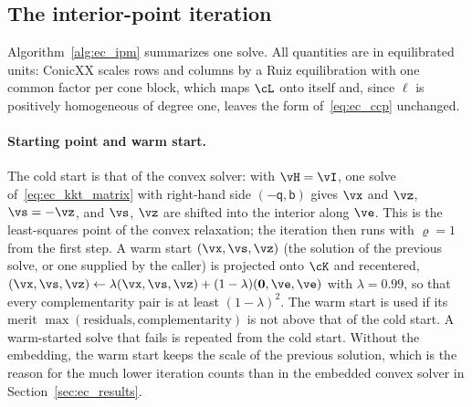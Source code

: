 \subsection{The interior-point iteration}\label{sec:ec_loop}
%
Algorithm~\ref{alg:ec_ipm} summarizes one solve. All quantities are in equilibrated units: ConicXX scales rows and columns by a Ruiz equilibration with one common factor per cone block, which maps $\cL$ onto itself and, since $\ell$ is positively homogeneous of degree one, leaves the form of~\eqref{eq:ec_ccp} unchanged.
%
\begin{algorithm}[t]
	\caption{Coulomb interior-point method ().}\label{alg:ec_ipm}
\end{algorithm}
%
\paragraph{Starting point and warm start.} The cold start is that of the convex solver: with $\vH = \vI$, one solve of~\eqref{eq:ec_kkt_matrix} with right-hand side $(-\mathsf{q}, \mathsf{b})$ gives $\vx$ and $\vz$, $\vs = -\vz$, and $\vs$, $\vz$ are shifted into the interior along $\ve$. This is the least-squares point of the convex relaxation; the iteration then runs with $\varrho = 1$ from the first step. A warm start $(\vx, \vs, \vz)$ (the solution of the previous solve, or one supplied by the caller) is projected onto $\cK$ and recentered, $(\vx, \vs, \vz) \leftarrow \lambda(\vx, \vs, \vz) + (1 - \lambda)(\mathbf{0}, \ve, \ve)$ with $\lambda = 0.99$, so that every complementarity pair is at least $(1 - \lambda)^2$. The warm start is used if its merit $\max(\text{residuals}, \text{complementarity})$ is not above that of the cold start. A warm-started solve that fails is repeated from the cold start. Without the embedding, the warm start keeps the scale of the previous solution, which is the reason for the much lower iteration counts than in the embedded convex solver in Section~\ref{sec:ec_results}.
%
